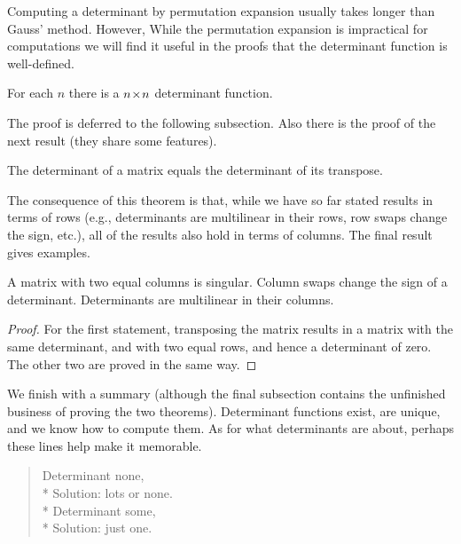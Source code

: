 Computing a determinant by permutation expansion usually takes longer than
Gauss' method.
However, 
While the permutation expansion is impractical for computations
we will find it useful in the proofs that 
the determinant function is well-defined.

\begin{theorem}
 \label{th:DetsExist}
For each $n$ there is a $n \! \times \! n$ determinant function.
\end{theorem}

The proof is deferred to the following subsection.
Also there is the proof of the next result (they share some features).

\begin{theorem}
The determinant of a matrix equals the determinant of its transpose.
\end{theorem}

The consequence of this theorem is that,
while we have so far stated results in terms of rows
(e.g., determinants are multilinear in their rows, row swaps change the
sign, etc.),
all of the results also hold in terms of columns.
The final result gives examples. 

\begin{corollary} \label{cor:ColSwapChgSign} \label{cor:DetsMultiInCols}
  A matrix with two equal columns is singular.
  Column swaps change the sign of a determinant.
  Determinants are multilinear in their columns.
\end{corollary}

\begin{proof}
For the first statement, 
transposing the matrix results in a matrix with the same determinant,
and with two equal rows, and hence a determinant of zero.
The other two are proved in the same way.
\end{proof}

We finish with a summary
(although the final subsection contains the unfinished business of
proving the two theorems).
Determinant functions exist, are unique, and we know how to compute them.
As for what determinants are about, perhaps these lines
\cite{Kemp} help make it memorable.
\begin{verse} \small
Determinant none,         \\*
Solution: lots or none.   \\*
Determinant some,         \\*
Solution: just one.
\end{verse}




